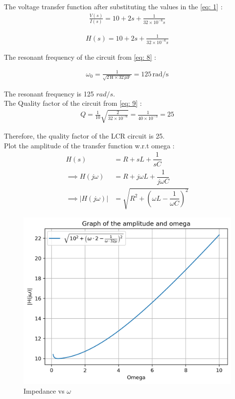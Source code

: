 \documentclass[journal,12pt,twocolumn]{IEEEtran}
\theoremstyle{remark}
\begin{document}
The voltage transfer function after substituting the values in the \eqref{eq: 1} :
\begin{align}
\frac{V(s)}{I(s)} = 10 + 2s + \frac{1}{32 \times 10^{-6}s}
\end{align}

\begin{align}
H(s) = 10 + 2s + \frac{1}{32 \times 10^{-6}s}
\end{align}


The resonant frequency of the circuit from \eqref{eq: 8} :

\begin{align}
\omega_0 = \frac{1}{\sqrt{2 \, \text{H} \times 32 \, \mu\text{F}}} = 125 \, \text{rad/s}
\end{align}

The resonant frequency is 125 $rad/s$.\\

The Quality factor of the circuit from \eqref{eq: 9} :
\begin{align}
Q = \frac{1}{10}\sqrt{\frac{2}{32 \times 10^{-6}}} = \frac{1}{40 \times 10^{-3}} = 25
\end{align}

Therefore, the quality factor of the LCR circuit is 25.\\

Plot the amplitude of the transfer function w.r.t omega : \\

\begin{align}
     H(s) &= R + sL + \dfrac{1}{sC}\\
     \implies H(j\omega) &= R + j\omega L + \dfrac{1}{j\omega C}\\
     \implies \lvert H(j\omega) \rvert &= \sqrt{R^2 + \left(\omega L - \dfrac{1}{\omega C}\right)^2}
\end{align}

\begin{figure}[!h]
    \centering
    \includegraphics[width = \columnwidth]{figs/q_plot.png}
    \caption{Impedance vs $\omega$}
    \label{fig:h_plot}
\end{figure}
\end{document}
